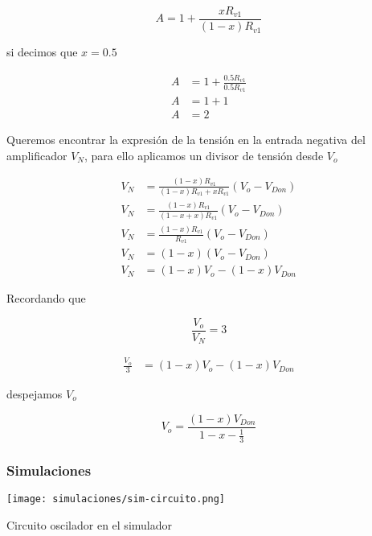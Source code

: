 \begin{equation}
    A = 1 + \frac{x R_{v1}}{(1-x)R_{v1}}
\end{equation}

si decimos que $x=0.5$ 

\begin{align*}
    A &= 1 + \frac{0.5 R_{v1}}{0.5 R_{v1}} \\
    A &= 1 + 1 \\
    A &= 2
\end{align*}

Queremos encontrar la expresión de la tensión en la entrada negativa del amplificador $V_N$, para ello aplicamos un divisor de tensión desde $V_o$

\begin{align*}
    V_N &= \frac{(1-x)R_{v1}}{(1-x)R_{v1} + x R_{v1}}(V_o - V_{Don}) \\
    V_N &= \frac{(1-x)R_{v1}}{(1-x +x)R_{v1}}(V_o - V_{Don})\\
    V_N &= \frac{(1-x)R_{v1}}{R_{v1}}(V_o - V_{Don}) \\
    V_N &= (1-x)(V_o - V_{Don}) \\
    V_N &= (1-x)V_o - (1-x)V_{Don} 
\end{align*}

Recordando que 

\begin{equation}
    \frac{V_o}{V_N} = 3
\end{equation}

\begin{align*}
    \frac{V_o}{3} &= (1-x)V_o - (1-x)V_{Don} 
\end{align*}

despejamos $V_o$

\begin{equation}
    V_o = \frac{(1-x)V_{Don}}{1-x - \frac{1}{3}}
\end{equation}

\paragraph{}

\FloatBarrier
\subsubsection{Simulaciones}

\begin{ilustracion}[ht]
    \centering
    \texttt{[image: simulaciones/sim-circuito.png]}
    \caption{Circuito oscilador en el simulador}
    \label{ilus:simulacion-circuito}
\end{ilustracion}

